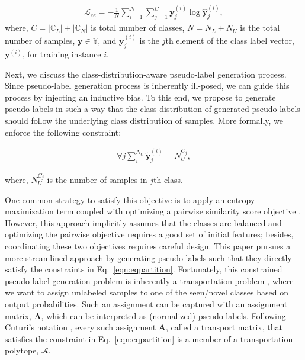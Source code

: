 \documentclass[runningheads]{eccv2022submission}
\begin{document}
\setlength{\abovedisplayskip}{-6pt}
\setlength{\belowdisplayskip}{2pt}
\setlength{\abovedisplayshortskip}{0pt}
\setlength{\belowdisplayshortskip}{0pt}

\begin{align}
\label{eqn:ce}
   \mathcal{L}_{ce} = {-\frac{1}{N}\sum_{i=1}^{N}\sum_{j=1}^{C}\mathbf{y}^{(i)}_j}\log\mathbf{\hat{y}}^{(i)}_j, 
\end{align}
where, $C={|\mathbb{C}_L| + |\mathbb{C}_N|}$ is total number of classes, $N={N_L + N_U}$ is the total number of samples, $\mathbf{y}\in\mathbb{Y}$, and $\mathbf{y}^{(i)}_j$ is the $j$th element of the class label vector, $\mathbf{y}^{(i)}$, for training instance $i$.  

Next, we discuss the class-distribution-aware pseudo-label generation process. Since pseudo-label generation process is inherently ill-posed, we can guide this process by injecting an inductive bias. To this end, we propose to generate pseudo-labels in such a way that the class distribution of generated pseudo-labels should follow the underlying class distribution of samples. More formally, we enforce the following constraint: 

\setlength{\abovedisplayskip}{-6pt}
\setlength{\belowdisplayskip}{2pt}
\setlength{\abovedisplayshortskip}{0pt}
\setlength{\belowdisplayshortskip}{0pt}

\begin{align}
\label{eqn:eqpartition}
   \forall j\sum_i^{N_U}\mathbf{\tilde{y}}_{j}^{(i)} = N_{U}^{C_j}, 
\end{align}

\noindent where, $N_{U}^{C_j}$ is the number of samples in $j$th class. 


One common strategy to satisfy this objective is to apply an entropy maximization term coupled with optimizing a pairwise similarity score objective \cite{cao2022openworld,van2020scan}. However, this approach implicitly assumes that the classes are balanced and optimizing the pairwise objective requires a good set of initial features; besides, coordinating these two objectives requires careful design. This paper pursues a more streamlined approach by generating pseudo-labels such that they directly satisfy the constraints in Eq.~\ref{eqn:eqpartition}. Fortunately, this constrained pseudo-label generation problem is inherently a transportation problem \cite{kantorovich1942translation,brenier1987decomposition}, where we want to assign unlabeled samples to one of the seen/novel classes based on output probabilities. Such an assignment can be captured with an assignment matrix, $\mathbf{A}$, which can be interpreted as (normalized) pseudo-labels. Following Cuturi's notation \cite{cuturi2013sinkhorn}, every such assignment $\mathbf{A}$, called a transport matrix, that satisfies the constraint in Eq.~\ref{eqn:eqpartition} is a member of a transportation polytope, $\mathcal{A}$. 
\end{document}
